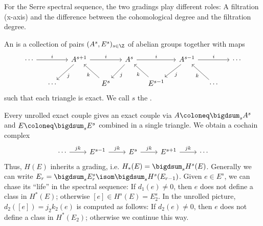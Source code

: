 For the Serre spectral sequence, the two gradings play different roles:
A filtration (x-axis) and the difference between the cohomological degree and the filtration degree.
\begin{definition}
	An  is a collection of pairs $(A^s, E^s)_{s \in \Z}$ of abelian groups together with maps
	\begin{equation*}
		\begin{tikzcd}[column sep = small]
			\cdots	
					\ar[rr, "i"]
				& & A^{s + 1}
					\ar[rr, "i"]
					\ar[dl, "j"]
				& & A^s
					\ar[rr, "i"]
					\ar[dl, "j"]
				& & A^{s - 1}
					\ar[rr, "i"]
					\ar[dl, "j"]
				& & \cdots
			\\
				& \cdots
				& & E^s
					\ar[ul, "k"]
				& & E^{s - 1}
					\ar[ul, "k"]
				& & \cdots
					\ar[ul, "k"]
		\end{tikzcd}
	\end{equation*}
	such that each triangle is exact.
	We call $s$ the .
\end{definition}
Every unrolled exact couple gives an exact couple via $A \coloneq \bigdsum_s A^s$ and $E \coloneq \bigdsum_s E^s$ combined in a single triangle.
We obtain a cochain complex
\begin{equation*}
	\begin{tikzcd}
		\cdots
				\ar[r, "jk"]
			& E^{s - 1}
				\ar[r, "jk"]
			& E^s
				\ar[r, "jk"]
			& E^{s + 1}
				\ar[r, "jk"]
			& \cdots
	\end{tikzcd}
\end{equation*}
Thus, $H(E)$ inherits a grading, i.e. $H_*(E) = \bigdsum_s H^s(E)$.
Generally we can write $E_r = \bigdsum_s E_r^s \isom \bigdsum_s H^s(E_{r - 1})$.
Given $e \in E^s$, we can chase its \enquote{life} in the spectral sequence:
If $d_1(e) \neq 0$, then $e$ does not define a class in $H^*(E)$; otherwise $[e] \in H^s(E) = E_2^s$.
In the unrolled picture, $d_2([e]) = j_2 k_2(e)$ is computed as follows:
If $d_2(e) \neq 0$, then $e$ does not define a class in $H^*(E_2)$; otherwise we continue this way.

